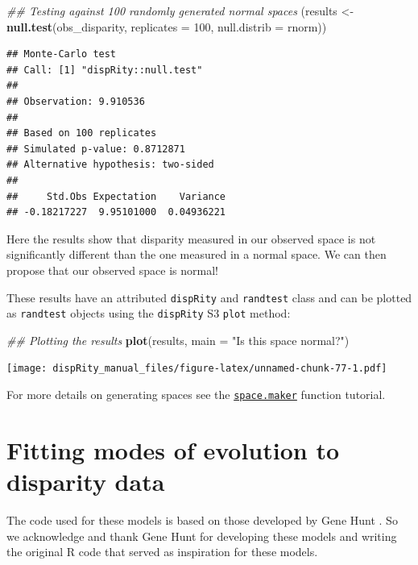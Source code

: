\documentclass[]{book}
\newenvironment{Shaded}{\begin{snugshade}}{\end{snugshade}}
\newcommand{\CommentTok}[1]{\textcolor[rgb]{0.56,0.35,0.01}{\textit{#1}}}
\newcommand{\DataTypeTok}[1]{\textcolor[rgb]{0.13,0.29,0.53}{#1}}
\newcommand{\DecValTok}[1]{\textcolor[rgb]{0.00,0.00,0.81}{#1}}
\newcommand{\KeywordTok}[1]{\textcolor[rgb]{0.13,0.29,0.53}{\textbf{#1}}}
\newcommand{\NormalTok}[1]{#1}
\newcommand{\StringTok}[1]{\textcolor[rgb]{0.31,0.60,0.02}{#1}}
\begin{document}
\begin{Shaded}
\begin{Highlighting}[]
\CommentTok{## Testing against 100 randomly generated normal spaces}
\NormalTok{(results <-}\StringTok{ }\KeywordTok{null.test}\NormalTok{(obs_disparity, }\DataTypeTok{replicates =} \DecValTok{100}\NormalTok{,}
                      \DataTypeTok{null.distrib =}\NormalTok{ rnorm))}
\end{Highlighting}
\end{Shaded}

\begin{verbatim}
## Monte-Carlo test
## Call: [1] "dispRity::null.test"
## 
## Observation: 9.910536 
## 
## Based on 100 replicates
## Simulated p-value: 0.8712871 
## Alternative hypothesis: two-sided 
## 
##     Std.Obs Expectation    Variance 
## -0.18217227  9.95101000  0.04936221
\end{verbatim}

Here the results show that disparity measured in our observed space is not significantly different than the one measured in a normal space.
We can then propose that our observed space is normal!

These results have an attributed \texttt{dispRity} and \texttt{randtest} class and can be plotted as \texttt{randtest} objects using the \texttt{dispRity} S3 \texttt{plot} method:

\begin{Shaded}
\begin{Highlighting}[]
\CommentTok{## Plotting the results}
\KeywordTok{plot}\NormalTok{(results, }\DataTypeTok{main =} \StringTok{"Is this space normal?"}\NormalTok{)}
\end{Highlighting}
\end{Shaded}

\texttt{[image: dispRity\_manual\_files/figure-latex/unnamed-chunk-77-1.pdf]}

For more details on generating spaces see the \protect\hyperlink{Simulating-multidimensional-spaces}{\texttt{space.maker}} function tutorial.

\hypertarget{model-fitting}{%
\section{Fitting modes of evolution to disparity data}\label{model-fitting}}

The code used for these models is based on those developed by Gene Hunt \citep{hunt2006fitting, hunt2012measuring, hunt2015simple}.
So we acknowledge and thank Gene Hunt for developing these models and writing the original R code that served as inspiration for these models.
\end{document}
